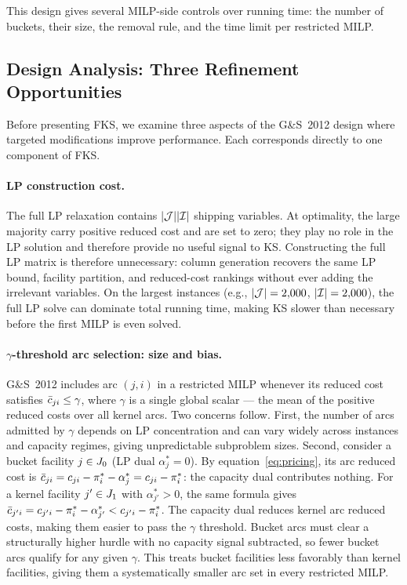 This design gives several MILP-side controls over running time: the number of
buckets, their size, the removal rule, and the time limit per restricted MILP.

\subsection{Design Analysis: Three Refinement Opportunities}
\label{sec:audit}

Before presenting FKS, we examine three aspects of the G\&S~2012 design where
targeted modifications improve performance.
Each corresponds directly to one component of FKS.

\paragraph{LP construction cost.}
The full LP relaxation contains $|\mathcal{J}||\mathcal{I}|$ shipping variables.
At optimality, the large majority carry positive reduced cost and are
set to zero; they play no role in the LP solution and therefore provide
no useful signal to KS.
Constructing the full LP matrix is therefore unnecessary: column generation
recovers the same LP bound, facility partition, and reduced-cost rankings
without ever adding the irrelevant variables.
On the largest instances (e.g., $|\mathcal{J}|=2{,}000$, $|\mathcal{I}|=2{,}000$), the full LP
solve can dominate total running time, making KS slower than necessary before
the first MILP is even solved.

\paragraph{$\gamma$-threshold arc selection: size and bias.}
G\&S~2012 includes arc $(j,i)$ in a restricted MILP whenever its reduced cost
satisfies $\bar{c}_{ji} \leq \gamma$, where $\gamma$ is a single global scalar ---
the mean of the positive reduced costs over all kernel arcs.
Two concerns follow.
First, the number of arcs admitted by $\gamma$ depends on LP concentration and
can vary widely across instances and capacity regimes, giving unpredictable
subproblem sizes.
Second, consider a bucket facility $j \in J_0$ (LP dual $\alpha^*_j = 0$).
By equation~\eqref{eq:pricing}, its arc reduced cost is
$\bar{c}_{ji} = c_{ji} - \pi^*_i - \alpha^*_j = c_{ji} - \pi^*_i$: the capacity
dual contributes nothing.
For a kernel facility $j' \in J_1$ with $\alpha^*_{j'} > 0$, the same
formula gives $\bar{c}_{j'i} = c_{j'i} - \pi^*_i - \alpha^*_{j'} < c_{j'i} - \pi^*_i$.
The capacity dual reduces kernel arc reduced costs, making them easier to pass
the $\gamma$ threshold.
Bucket arcs must clear a structurally higher hurdle with no capacity signal
subtracted, so fewer bucket arcs qualify for any given $\gamma$.
This treats bucket facilities less favorably than kernel facilities, giving
them a systematically smaller arc set in every restricted MILP.

